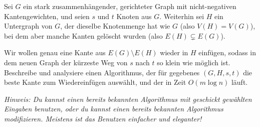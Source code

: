 \documentclass{uebung_cs}
\begin{document}
Sei $G$ ein stark zusammenhängender, gerichteter Graph mit nicht-negativen Kantengewichten, und seien $s$ und $t$ Knoten aus $G$.
Weiterhin sei $H$ ein Untergraph von $G$, der dieselbe Knotenmenge hat wie $G$ (also $V(H)=V(G)$), bei dem aber manche Kanten gelöscht wurden (also $E(H)\subsetneq E(G)$).

Wir wollen genau eine Kante aus $E(G)\setminus E(H)$ wieder in $H$ einfügen, sodass in dem neuen Graph der kürzeste Weg von $s$ nach $t$ so klein wie möglich ist.
Beschreibe und analysiere einen Algorithmus, der für gegebenes $(G,H,s,t)$ die beste Kante zum Wiedereinfügen auswählt, und der in Zeit $O(m\log n)$ läuft.

\emph{Hinweis: Du kannst einen bereits bekannten Algorithmus mit geschickt gewählten Eingaben benutzen, oder du kannst einen bereits bekannten Algorithmus modifizieren. Meistens ist das Benutzen einfacher und eleganter!}


\end{document}
